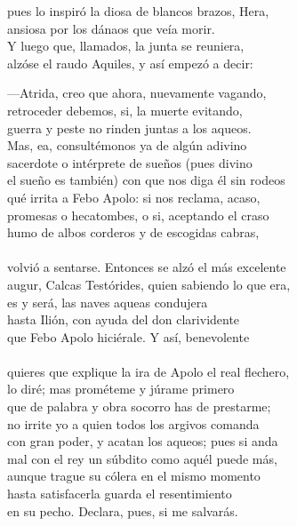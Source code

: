 pues lo inspiró la diosa de blancos brazos, Hera,\\
ansiosa por los dánaos que veía morir.\\
Y luego que, llamados, la junta se reuniera,\\
alzóse el raudo Aquiles, y así empezó a decir:\par
---Atrida, creo que ahora, nuevamente vagando,\\
retroceder debemos, si, la muerte evitando,\\
guerra y peste no rinden juntas a los aqueos.\\
Mas, ea, consultémonos ya de algún adivino\\
sacerdote o intérprete de sueños (pues divino\\
el sueño es también) con que nos diga él sin rodeos\\
qué irrita a Febo Apolo: si nos reclama, acaso,\\
promesas o hecatombes, o si, aceptando el craso\\
humo de albos corderos y de escogidas cabras,\\
\\
volvió a sentarse. Entonces se alzó el más excelente\\
augur, Calcas Testórides, quien sabiendo lo que era,\\
es y será, las naves aqueas condujera\\
hasta Ilión, con ayuda del don clarividente\\
que Febo Apolo hiciérale. Y así, benevolente\\
\\
quieres que explique la ira de Apolo el real flechero,\\
lo diré; mas prométeme y júrame primero\\
que de palabra y obra socorro has de prestarme;\\
no irrite yo a quien todos los argivos comanda\\
con gran poder, y acatan los aqueos; pues si anda\\
mal con el rey un súbdito como aquél puede más,\\
aunque trague su cólera en el mismo momento\\
hasta satisfacerla guarda el resentimiento\\
en su pecho. Declara, pues, si me salvarás.\par
{}\\
